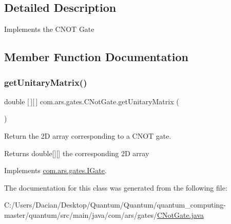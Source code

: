 \subsection{Detailed Description}
Implements the C\+N\+OT Gate 

\subsection{Member Function Documentation}
\hypertarget{classcom_1_1ars_1_1gates_1_1_c_not_gate_a3a78f3ef3d7a418a51b3fabc46954ec5}{}\label{classcom_1_1ars_1_1gates_1_1_c_not_gate_a3a78f3ef3d7a418a51b3fabc46954ec5} 
\subsubsection{\texorpdfstring{get\+Unitary\+Matrix()}{getUnitaryMatrix()}}
{\footnotesize\ttfamily double \mbox{[}$\,$\mbox{]}\mbox{[}$\,$\mbox{]} com.\+ars.\+gates.\+C\+Not\+Gate.\+get\+Unitary\+Matrix (\begin{DoxyParamCaption}{ }\end{DoxyParamCaption})}

Return the 2D array corresponding to a C\+N\+OT gate. \begin{DoxyReturn}{Returns}
double\mbox{[}\mbox{]}\mbox{[}\mbox{]} the corresponding 2D array 
\end{DoxyReturn}


Implements \hyperlink{interfacecom_1_1ars_1_1gates_1_1_i_gate_a6a940b3a6940cd97429aa211143121cb}{com.\+ars.\+gates.\+I\+Gate}.



The documentation for this class was generated from the following file\+:\begin{DoxyCompactItemize}
\item 
C\+:/\+Users/\+Dacian/\+Desktop/\+Quantum/\+Quantum/quantum\+\_\+computing-\/master/quantum/src/main/java/com/ars/gates/\hyperlink{_c_not_gate_8java}{C\+Not\+Gate.\+java}\end{DoxyCompactItemize}

